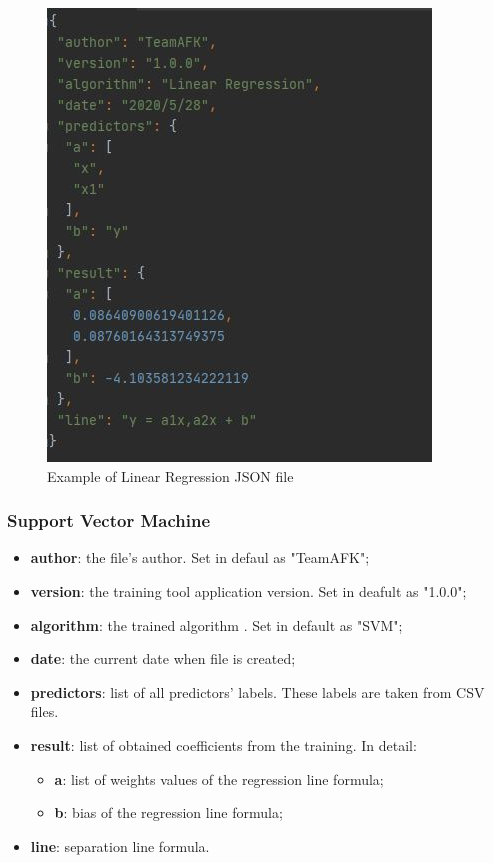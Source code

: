 		\begin{figure}[H]
		\centering
		\includegraphics[scale=0.70]{../Developer_manual/img/linear_regression_json.jpg}
		\caption{Example of Linear Regression JSON file}
	\end{figure}	
	
		\subsubsection{Support Vector Machine}
		\begin{itemize}
			\item\textbf{author}: the file's author. Set in defaul as "TeamAFK";
			\item\textbf{version}: the training tool application version. Set in deafult as "1.0.0";
			\item\textbf{algorithm}: the trained algorithm . Set in default as "SVM"; 	
			\item\textbf{date}: the current date when file is created;
			\item\textbf{predictors}: list of all predictors' labels. These labels are taken from CSV files.
			\item\textbf{result}: list of obtained coefficients from the training. In detail:
				\begin{itemize}
					\item\textbf{a}: list of weights values of the regression line formula;
					\item\textbf{b}: bias of the regression line formula;
				\end{itemize}
			\item\textbf{line}: separation line formula.
					
		\end{itemize}
		
